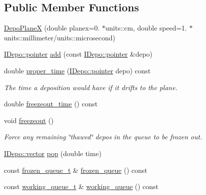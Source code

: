 \subsection*{Public Member Functions}
\begin{DoxyCompactItemize}
\item 
\hyperlink{class_wire_cell_1_1_gen_1_1_depo_plane_x_accbd66291fc864d1b5fb10a6d687a50f}{Depo\+PlaneX} (double planex=0. $\ast$units\+::cm, double speed=1. $\ast$units\+::millimeter/units\+::microsecond)
\item 
\hyperlink{class_wire_cell_1_1_i_data_aff870b3ae8333cf9265941eef62498bc}{I\+Depo\+::pointer} \hyperlink{class_wire_cell_1_1_gen_1_1_depo_plane_x_aac384ecc32db5e99b6ed308ff45e14de}{add} (const \hyperlink{class_wire_cell_1_1_i_data_aff870b3ae8333cf9265941eef62498bc}{I\+Depo\+::pointer} \&depo)
\item 
double \hyperlink{class_wire_cell_1_1_gen_1_1_depo_plane_x_aa5929aed1786b27d74603a7b92aecb78}{proper\+\_\+time} (\hyperlink{class_wire_cell_1_1_i_data_aff870b3ae8333cf9265941eef62498bc}{I\+Depo\+::pointer} depo) const
\begin{DoxyCompactList}\small\item\em The time a deposition would have if it drifts to the plane. \end{DoxyCompactList}\item 
double \hyperlink{class_wire_cell_1_1_gen_1_1_depo_plane_x_a3a9d553d5ade20322d03cb7e175babc8}{freezeout\+\_\+time} () const
\item 
void \hyperlink{class_wire_cell_1_1_gen_1_1_depo_plane_x_a8390619e6c7ddc2c7a60140ea7339336}{freezeout} ()
\begin{DoxyCompactList}\small\item\em Force any remaining \char`\"{}thawed\char`\"{} depos in the queue to be frozen out. \end{DoxyCompactList}\item 
\hyperlink{class_wire_cell_1_1_i_data_ae1a9f863380499bb43f39fabb6276660}{I\+Depo\+::vector} \hyperlink{class_wire_cell_1_1_gen_1_1_depo_plane_x_a1558bc9b6186a753d8b8f73fbd833475}{pop} (double time)
\item 
const \hyperlink{class_wire_cell_1_1_gen_1_1_depo_plane_x_a4f4387d05fb9d3a02c96da6abac2861e}{frozen\+\_\+queue\+\_\+t} \& \hyperlink{class_wire_cell_1_1_gen_1_1_depo_plane_x_a05b5b5aae520941719605f4eba4caa5e}{frozen\+\_\+queue} () const
\item 
const \hyperlink{class_wire_cell_1_1_gen_1_1_depo_plane_x_ade1129aabbdd7bc1d4e880169d715a19}{working\+\_\+queue\+\_\+t} \& \hyperlink{class_wire_cell_1_1_gen_1_1_depo_plane_x_a599119cba4e43cde20f055b64a0139f0}{working\+\_\+queue} () const
\end{DoxyCompactItemize}


